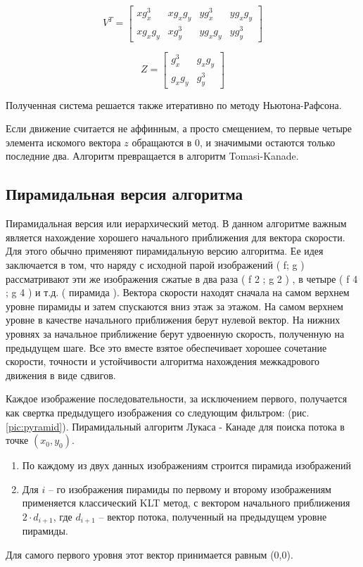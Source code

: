 $$V^T=\begin{bmatrix}
xg^3_x & xg_xg_y & yg^3_x & yg_xg_y \\
xg_xg_y & xg^3_y & yg_xg_y & yg^3_y
\end{bmatrix}$$

$$Z=\begin{bmatrix}
g^3_x & g_xg_y \\
g_xg_y & g^3_y
\end{bmatrix}$$

Полученная система решается также итеративно по методу Ньютона-Рафсона.

Если движение считается не аффинным, а просто смещением, то первые четыре элемента искомого вектора $z$ обращаются в 0, и значимыми остаются только последние два. Алгоритм превращается в алгоритм Tomasi-Kanade.

\subsection{Пирамидальная версия алгоритма}

Пирамидальная версия или иерархический метод. В данном алгоритме важным является нахождение хорошего начального приближения для вектора скорости. Для этого обычно применяют пирамидальную версию алгоритма. Ее идея заключается в том, что наряду с исходной парой изображений ( f; g ) рассматривают эти же изображения сжатые в два раза ( f 2 ; g 2 ) , в четыре ( f 4 ; g 4 ) и  т.д.  ( пирамида ).  Вектора  скорости находят  сначала  на  самом  верхнем  уровне  пирамиды и затем спускаются вниз этаж за этажом. На самом верхнем уровне в качестве начального приближения берут нулевой вектор. На нижних уровнях за начальное приближение берут удвоенную скорость, полученную на предыдущем шаге. Все это вместе взятое обеспечивает хорошее сочетание скорости, точности и устойчивости алгоритма  нахождения  межкадрового  движения  в  виде сдвигов.

Каждое изображение последовательности, за исключением первого, получается как свертка предыдущего изображения со следующим фильтром:
(рис. \ref{pic:pyramid}).
Пирамидальный алгоритм Лукаса - Канаде для поиска потока в точке $(x_0,y_0)$.
\begin{enumerate}
\item По каждому из двух данных изображениям строится пирамида изображений
\item Для $i$ – го изображения пирамиды по первому и второму изображениям применяется классический KLT метод, с вектором начального приближения $2 \cdot d_{i+1}$, где $d_{i+1}$ – вектор потока, полученный на предыдущем уровне пирамиды.
\end{enumerate}
Для самого первого уровня этот вектор принимается равным (0,0).

